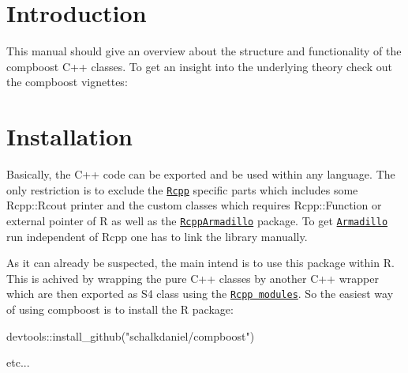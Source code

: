 \hypertarget{index_intro_sec}{}\section{Introduction}\label{index_intro_sec}
This manual should give an overview about the structure and functionality of the {\ttfamily compboost} {\ttfamily C++} classes. To get an insight into the underlying theory check out the {\ttfamily compboost} vignettes\+:\hypertarget{index_install_sec}{}\section{Installation}\label{index_install_sec}
Basically, the {\ttfamily C++} code can be exported and be used within any language. The only restriction is to exclude the \href{https://cran.r-project.org/web/packages/Rcpp/vignettes/Rcpp-introduction.pdf}{\tt {\ttfamily Rcpp}} specific parts which includes some {\ttfamily Rcpp\+::\+Rcout} printer and the custom classes which requires {\ttfamily Rcpp\+::\+Function} or external pointer of {\ttfamily R} as well as the \href{https://cran.r-project.org/web/packages/RcppArmadillo/vignettes/RcppArmadillo-intro.pdf}{\tt {\ttfamily Rcpp\+Armadillo}} package. To get \href{http://arma.sourceforge.net}{\tt {\ttfamily Armadillo}} run independent of {\ttfamily Rcpp} one has to link the library manually.

As it can already be suspected, the main intend is to use this package within {\ttfamily R}. This is achived by wrapping the pure {\ttfamily C++} classes by another {\ttfamily C++} wrapper which are then exported as {\ttfamily S4} class using the \href{https://cran.r-project.org/web/packages/Rcpp/vignettes/Rcpp-modules.pdf}{\tt Rcpp modules}. So the easiest way of using {\ttfamily compboost} is to install the {\ttfamily R} package\+:


\begin{DoxyCode}
devtools::install\_github(\textcolor{stringliteral}{"schalkdaniel/compboost"})
\end{DoxyCode}


etc... 